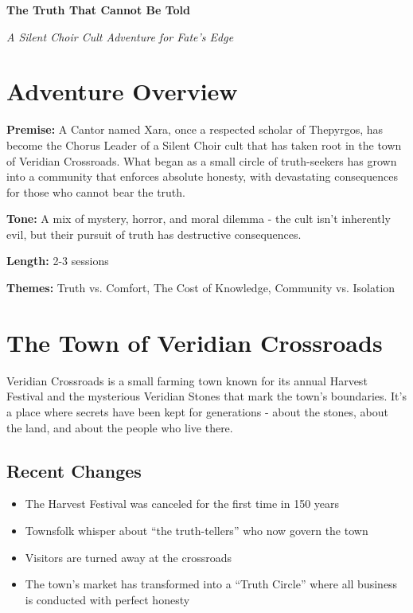 \documentclass[11pt]{article}
\newcommand{\adventuretitle}[1]{\begin{center}\colorbox{headerblue}{\parbox{\textwidth}{\centering\color{white}\Huge\textbf{#1}}}\end{center}}
\newcommand{\keypoint}[1]{\par\noindent\textbf{\textcolor{accentorange}{#1}}}
\begin{document}



\adventuretitle{The Truth That Cannot Be Told}

\begin{center}
\textit{A Silent Choir Cult Adventure for Fate's Edge}
\end{center}

\section{Adventure Overview}

\keypoint{Premise:} A Cantor named Xara, once a respected scholar of Thepyrgos, has become the Chorus Leader of a Silent Choir cult that has taken root in the town of Veridian Crossroads. What began as a small circle of truth-seekers has grown into a community that enforces absolute honesty, with devastating consequences for those who cannot bear the truth.

\keypoint{Tone:} A mix of mystery, horror, and moral dilemma - the cult isn't inherently evil, but their pursuit of truth has destructive consequences.

\keypoint{Length:} 2-3 sessions

\keypoint{Themes:} Truth vs. Comfort, The Cost of Knowledge, Community vs. Isolation

\section{The Town of Veridian Crossroads}

Veridian Crossroads is a small farming town known for its annual Harvest Festival and the mysterious Veridian Stones that mark the town's boundaries. It's a place where secrets have been kept for generations - about the stones, about the land, and about the people who live there.

\subsection{Recent Changes}
\begin{itemize}[leftmargin=*]
    \item The Harvest Festival was canceled for the first time in 150 years
    \item Townsfolk whisper about ``the truth-tellers'' who now govern the town
    \item Visitors are turned away at the crossroads
    \item The town's market has transformed into a ``Truth Circle'' where all business is conducted with perfect honesty
\end{itemize}
\end{document}
